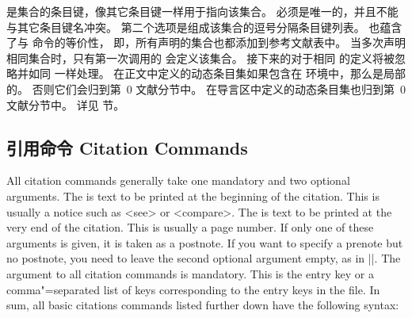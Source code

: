 \begin{ltxsyntax}



 是集合的条目键，像其它条目键一样用于指向该集合。
 必须是唯一的，并且不能与其它条目键名冲突。
第二个选项是组成该集合的逗号分隔条目键列表。
 也蕴含了与  命令的等价性，
即，所有声明的集合也都添加到参考文献表中。
当多次声明相同集合时，只有第一次调用的  会定义该集合。
接下来的对于相同  的定义将被忽略并如同  一样处理。
在正文中定义的动态条目集如果包含在  环境中，那么是局部的。
否则它们会归到第~0 文献分节中。
在导言区中定义的动态条目集也归到第~0 文献分节中。
详见  节。

\end{ltxsyntax}

\subsection{引用命令 Citation Commands}
\label{use:cit}

All citation commands generally take one mandatory and two optional arguments. The  is text to be printed at the beginning of the citation. This is usually a notice such as <see> or <compare>. The  is text to be printed at the very end of the citation. This is usually a page number. If only one of these arguments is given, it is taken as a postnote. If you want to specify a prenote but no postnote, you need to leave the second optional argument empty, as in |\cite[see][]{key}|. The  argument to all citation commands is mandatory. This is the entry key or a comma"=separated list of keys corresponding to the entry keys in the  file. In sum, all basic citations commands listed further down have the following syntax:


